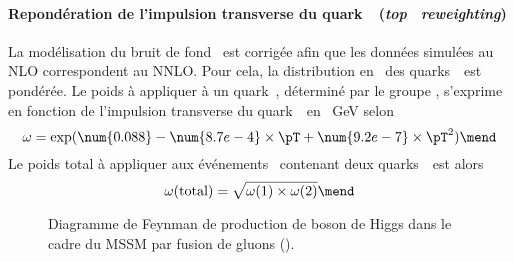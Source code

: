 \paragraph{Repondération de l'impulsion transverse du quark~\quarkt\ (\emph{top \pT\ reweighting})}
La modélisation du bruit de fond \ttbar\ est corrigée afin que les données simulées au NLO correspondent au NNLO.
Pour cela, la distribution en \pT\ des quarks~\quarkt\ est pondérée.
Le poids à appliquer à un quark~\quarkt, déterminé par le groupe \quarkt\antiquarkt\Higgs, s'exprime en fonction de l'impulsion transverse du quark~\quarkt\ en \SI{}{\GeV} selon
\begin{equation}
\omega = \exp(\num{0.088} - \num{8.7e-4}\times\pT + \num{9.2e-7}\times\pT^2)
\mend
\end{equation}
Le poids total à appliquer aux événements \ttbar\ contenant deux quarks~\quarkt\ est alors
\begin{equation}
\omega(\text{total}) = \sqrt{\omega(1) \times \omega(2)}
\mend
\end{equation}
\begin{wrapfigure}{R}{5cm}
\vspace{\baselineskip}
\centering
\vspace{\baselineskip}
\caption[Production de boson de Higgs du MSSM par fusion de gluons.]{Diagramme de Feynman de production de boson de Higgs dans le cadre du MSSM par fusion de gluons (\gluon\gluon\Higgs).}
\label{fig-chapter-HTT_analysis-section-corrections-fgraph-gg_loop_hHA}
\end{wrapfigure}
